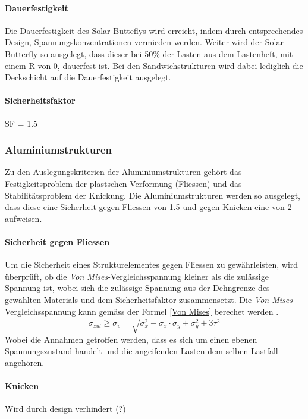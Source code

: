 \paragraph{Dauerfestigkeit}
Die Dauerfestigkeit des Solar Butteflys wird erreicht, indem durch entsprechendes Design, Spannungskonzentrationen vermieden werden. Weiter wird der Solar Butterfly so ausgelegt, dass dieser bei 50\% der Lasten aus dem Lastenheft, mit einem R von 0, dauerfest ist. Bei den Sandwichstrukturen wird dabei lediglich die Deckschicht auf die Dauerfestigkeit ausgelegt.

\paragraph{Sicherheitsfaktor}
SF = 1.5

  \subsubsection{Aluminiumstrukturen}
  Zu den Auslegungskriterien der Aluminiumstrukturen gehört das Festigkeitsproblem der plastschen Verformung (Fliessen) und das Stabilitätsproblem der Knickung. Die Aluminiumstrukturen werden so ausgelegt, dass diese eine Sicherheit gegen Fliessen von 1.5 und gegen Knicken eine von 2 aufweisen.

  \paragraph{Sicherheit gegen Fliessen}
  Um die Sicherheit eines Strukturelementes gegen Fliessen zu gewährleisten, wird überprüft, ob die \emph{Von Mises}-Vergleichsspannung kleiner als die zulässige Spannung ist, wobei sich die zulässige Spannung aus der Dehngrenze des gewählten Materials und dem Sicherheitsfaktor zusammensetzt. Die \emph{Von Mises}-Vergleichsspannung kann gemäss der Formel \ref{Von Mises} berechet werden \cite{Baertsch}.
  \begin{equation}
    \label{Von Mises}
    \sigma_{zul} \geq \sigma_v = \sqrt{\sigma_x^{2}-\sigma_x \cdot \sigma_y + \sigma_y^2 + 3\tau^2}
  \end{equation}
  Wobei die Annahmen getroffen werden, dass es sich um einen ebenen Spannungszustand handelt und die angeifenden Lasten dem selben Lastfall angehören.

  \paragraph{Knicken}
  Wird durch design verhindert (?)

